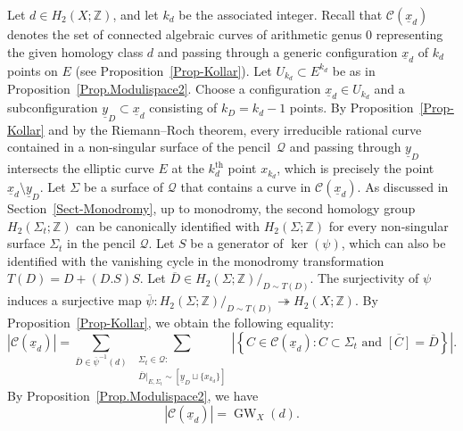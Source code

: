 \documentclass[11pt]{amsart}
\numberwithin{equation}{section}
\theoremstyle{definition}
\theoremstyle{plain}
\theoremstyle{remark}
\newcommand{\Z}{\mathbb{Z}}
\DeclareMathOperator{\GW}{GW}
\newcommand{\supth}[1]{\ensuremath{#1^{\mathrm{th}}}}
\begin{document}
Let $d\in H_2(X;\Z)$, and let $k_d$ be the associated integer.  Recall that $\mathcal{C}(\underline{x}_d)$ denotes the set of connected algebraic curves of arithmetic genus $0$ representing the given homology class $d$ and passing through a generic configuration $\underline{x}_d$ of $k_d$ points on $E$ (see Proposition~\ref{Prop-Kollar}).  Let ${U}_{k_d}\subset E^{k_d}$ be as in Proposition~\ref{Prop.Modulispace2}. Choose a configuration $\underline{x}_d\in {U}_{k_d}$ and a subconfiguration $\underline{y}_D\subset \underline{x}_d$ consisting of $k_D=k_d-1$ points.  By Proposition~\ref{Prop-Kollar} and by the Riemann--Roch theorem, every irreducible rational curve contained in a non-singular surface of the pencil~$\mathcal{Q}$ and passing through $\underline{y}_D$ intersects the elliptic curve $E$ at the $\supth{k_d}$ point $x_{k_d}$, which is precisely the point $\underline{x}_d\setminus \underline{y}_D$.  Let $\Sigma$ be a surface of $\mathcal{Q}$ that contains a curve in $\mathcal{C}(\underline{x}_d)$.  As discussed in Section~\ref{Sect-Monodromy}, up to monodromy, the second homology group $H_2(\Sigma_t;\Z)$ can be canonically identified with $H_2(\Sigma;\Z)$ for every non-singular surface $\Sigma_t$ in the pencil $\mathcal{Q}$.  Let $S$ be a generator of $\ker(\psi)$, which can also be identified with the vanishing cycle in the monodromy transformation $T(D)=D+(D.S)S$.  Let $\overline{D}\in H_2(\Sigma;\Z)/_ {D\sim T(D)}$.  The surjectivity of $\psi$ induces a surjective map $\overline{\psi}\colon H_2(\Sigma;\Z)/_ {D\sim T(D)}\twoheadrightarrow H_2(X;\Z)$. By Proposition~\ref{Prop-Kollar}, we obtain the following equality:
    \begin{equation*}
        \left|\mathcal{C}\left(\underline{x}_d\right)\right|=\sum_{\overline{D}\in \overline{\psi}^{-1}(d)}\;\sum_{\substack{\Sigma_t\in\mathcal{Q}:\\
                 \overline{D}|_{E,\Sigma_t}\sim [\underline{y}_D\sqcup \{x_{k_d}\}]
                 }}\left|\left\{C\in \mathcal{C}\left(\underline{x}_d\right): C \subset \Sigma_t \text{ and } \overline{[C]}=\overline{D} \right\}\right|.
    \end{equation*}
    By Proposition~\ref{Prop.Modulispace2}, we have
    $$\left|\mathcal{C}(\underline{x}_d)\right|=\GW_X(d).$$
\end{document}

